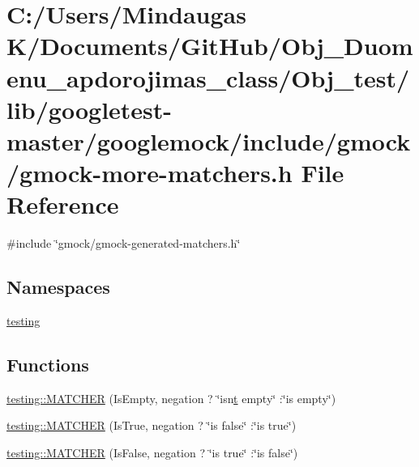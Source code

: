 \hypertarget{_obj__test_2lib_2googletest-master_2googlemock_2include_2gmock_2gmock-more-matchers_8h}{}\section{C\+:/\+Users/\+Mindaugas K/\+Documents/\+Git\+Hub/\+Obj\+\_\+\+Duomenu\+\_\+apdorojimas\+\_\+class/\+Obj\+\_\+test/lib/googletest-\/master/googlemock/include/gmock/gmock-\/more-\/matchers.h File Reference}
\label{_obj__test_2lib_2googletest-master_2googlemock_2include_2gmock_2gmock-more-matchers_8h}
{\ttfamily \#include \char`\"{}gmock/gmock-\/generated-\/matchers.\+h\char`\"{}}\newline
\subsection*{Namespaces}
\begin{DoxyCompactItemize}
\item 
 \mbox{\hyperlink{namespacetesting}{testing}}
\end{DoxyCompactItemize}
\subsection*{Functions}
\begin{DoxyCompactItemize}
\item 
\mbox{\hyperlink{namespacetesting_a4fcb3f407119590471bea5a90a8d2dda}{testing\+::\+M\+A\+T\+C\+H\+ER}} (Is\+Empty, negation ? \char`\"{}isn\textquotesingle{}\mbox{\hyperlink{_mutual_8h_a978d88b393c8a37dc2614c88788b3442}{t}} empty\char`\"{} \+:\char`\"{}is empty\char`\"{})
\item 
\mbox{\hyperlink{namespacetesting_ab2b645db6909220993662cf43ed0d9e8}{testing\+::\+M\+A\+T\+C\+H\+ER}} (Is\+True, negation ? \char`\"{}is false\char`\"{} \+:\char`\"{}is true\char`\"{})
\item 
\mbox{\hyperlink{namespacetesting_a03fb223cceaefc67991ac36286dcbb34}{testing\+::\+M\+A\+T\+C\+H\+ER}} (Is\+False, negation ? \char`\"{}is true\char`\"{} \+:\char`\"{}is false\char`\"{})
\end{DoxyCompactItemize}
